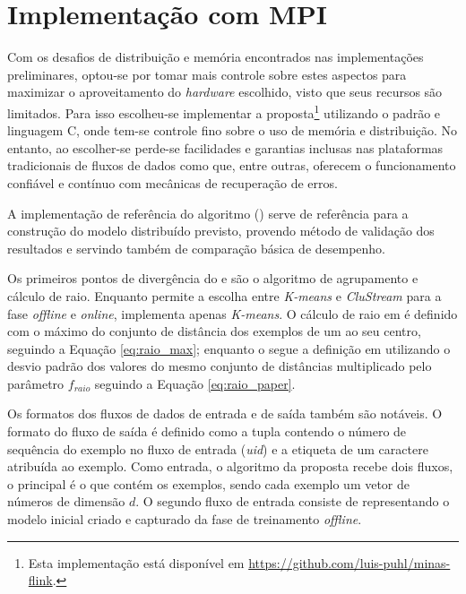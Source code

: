 
\section{Implementação com MPI}

Com os desafios de distribuição e memória encontrados nas implementações
preliminares, optou-se por tomar mais controle sobre estes aspectos para
maximizar o aproveitamento do \emph{hardware} escolhido, visto que seus recursos
são limitados.
Para isso escolheu-se implementar a proposta\footnote{Esta implementação está
disponível em \url{https://github.com/luis-puhl/minas-flink}.} utilizando o
padrão \mpi e linguagem C, onde tem-se controle fino sobre o uso de memória e
distribuição.
No entanto, ao escolher-se \mpi perde-se facilidades e garantias inclusas nas
plataformas tradicionais de fluxos de dados como \flink que, entre outras,
oferecem o funcionamento confiável e contínuo com mecânicas de recuperação de
erros.

A implementação de referência do algoritmo \minas \cite{Faria2013source}
() serve de referência para a construção do modelo distribuído
previsto, provendo método de validação dos resultados e servindo também de
comparação básica de desempenho.

Os primeiros pontos de divergência do \mfog e  são o algoritmo de
agrupamento e cálculo de raio.
Enquanto  permite a escolha entre \emph{K-means} e \emph{CluStream} para a
fase \emph{offline} e \emph{online}, \mfog implementa apenas \emph{K-means}.
O cálculo de raio em  é definido com o máximo do conjunto de distância
dos exemplos de um \mcluster ao seu centro, seguindo a Equação \ref{eq:raio_max};
enquanto o \mfog segue a definição em  utilizando o
desvio padrão dos valores do mesmo conjunto de distâncias multiplicado pelo
parâmetro $f_{raio}$ seguindo a Equação \ref{eq:raio_paper}.

Os formatos dos fluxos de dados de entrada e de saída também são notáveis.
O formato do fluxo de saída é definido como a tupla contendo o número de
sequência do exemplo no fluxo de entrada (\emph{uid}) e a etiqueta de um caractere
atribuída ao exemplo.
Como
entrada, o algoritmo da proposta recebe dois fluxos, o principal é o que contém
os exemplos, sendo cada exemplo um vetor de números de dimensão $d$.
O segundo fluxo de entrada consiste de \mclusters representando o modelo inicial
criado e capturado da fase de treinamento \emph{offline}.

